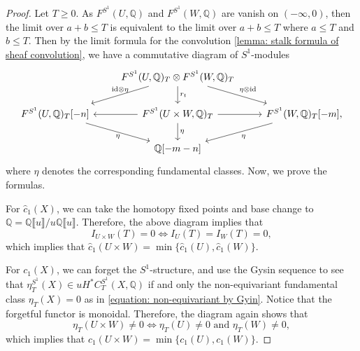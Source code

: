\documentclass[11pt]{amsart}
\numberwithin{equation}{section}
\theoremstyle{plain}
\theoremstyle{definition}
\theoremstyle{remark}
\newcommand{\bQ} { {\mathbb{Q}}}
\newcommand{\id}{{\operatorname{id}}}
\newcommand{\fpw}[1]{{\llbracket #1\rrbracket}}
\begin{document}
\begin{proof}Let $T\geq 0$. As $F^{S^1}(U,\bQ)$ and $F^{S^1}(W,\bQ)$ are vanish on $(-\infty,0)$, then the limit over $a+b\leq T$ is equivalent to the limit over $a+b\leq T$ where $a\leq T$ and $b\leq T$. Then by the limit formula for the convolution \autoref{lemma: stalk formula of sheaf convolution}, we have a commutative diagram of $S^1$-modules
\[\begin{tikzcd}
                                      & {F^{S^1}(U,\bQ)_T\otimes F^{S^1}(W,\bQ)_T} \arrow[d, "r_t"] \arrow[rd, "\eta\otimes\id"] \arrow[ld, "\id \otimes \eta" above] &                                       \\
{F^{S^1}(U,\bQ)_T[-n]} \arrow[rd, "\eta" below] & {F^{S^1}(U\times W,\bQ)_T} \arrow[l] \arrow[r] \arrow[d, "\eta"]                                                   & {F^{S^1}(W,\bQ)_T[-m]} ,\arrow[ld, "\eta"] \\
                                      & \bQ[-m-n]                                                                                                                  &                                      
\end{tikzcd}\]
where $\eta$ denotes the corresponding fundamental classes.
Now, we prove the formulas. 

For $\widehat{c}_1(X)$, we can take the homotopy fixed points and base change to $\bQ = \bQ\fpw{u}/u\bQ\fpw{u}$. Therefore, the above diagram implies that
\[I_{U\times W}(T)=0 \iff I_{U}(T)=I_{W}(T)=0,\]
which implies that
$\widehat{c}_1(U \times W) = \min\{\widehat{c}_1(U), \widehat{c}_1(W)\}.$

For ${c}_1(X)$, we can forget the $S^1$-structure, and use the Gysin sequence to see that $\eta^{S^1}_T(X)\in uH^*C_T^{S^1}(X,\bQ)$ if and only the non-equivariant fundamental class $\eta_T(X)=0$ as in \autoref{equation: non-equivariant by Gyin}. Notice that the forgetful functor is monoidal. Therefore, the diagram again shows that 
\[\eta_T(U\times W)\neq 0 \iff \eta_T(U )\neq 0 \text{ and }\eta_T( W)\neq 0,\] 
which implies that
$ {c}_1(U \times W) = \min\{ {c}_1(U),  {c}_1(W)\}.$
\end{proof}
\end{document}
